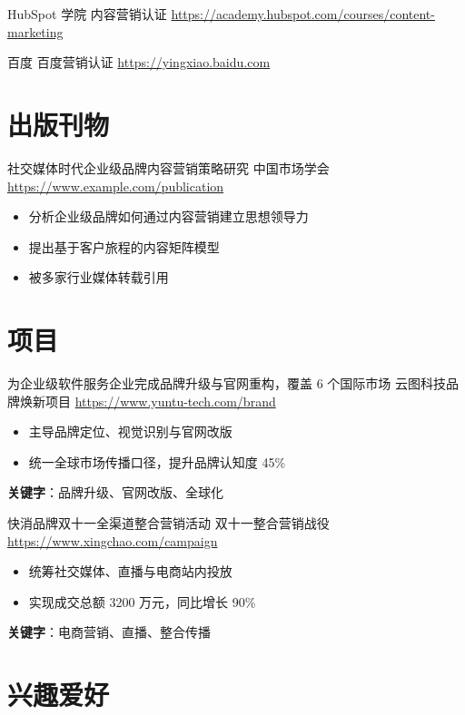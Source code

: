 \documentclass[a4paper, serif, 10pt]{moderncv}
\begin{document}
        {HubSpot 学院}
        {内容营销认证}
        {\url{https://academy.hubspot.com/courses/content-marketing}}
        {}
        {}

        {百度}
        {百度营销认证}
        {\url{https://yingxiao.baidu.com}}
        {}
        {}
\section{出版刊物}

        {社交媒体时代企业级品牌内容营销策略研究}
        {中国市场学会}
        {\url{https://www.example.com/publication}}
        {}
        {\begin{itemize}
\item 分析企业级品牌如何通过内容营销建立思想领导力
\item 提出基于客户旅程的内容矩阵模型
\item 被多家行业媒体转载引用
\end{itemize}}
\section{项目}

        {为企业级软件服务企业完成品牌升级与官网重构，覆盖 6 个国际市场}
        {云图科技品牌焕新项目}
        {\url{https://www.yuntu-tech.com/brand}}
        {}
        {\begin{itemize}
\item 主导品牌定位、视觉识别与官网改版
\item 统一全球市场传播口径，提升品牌认知度 45\%
\end{itemize}
\textbf{关键字}：品牌升级、官网改版、全球化}

        {快消品牌双十一全渠道整合营销活动}
        {双十一整合营销战役}
        {\url{https://www.xingchao.com/campaign}}
        {}
        {\begin{itemize}
\item 统筹社交媒体、直播与电商站内投放
\item 实现成交总额 3200 万元，同比增长 90\%
\end{itemize}
\textbf{关键字}：电商营销、直播、整合传播}
\section{兴趣爱好}

\end{document}
